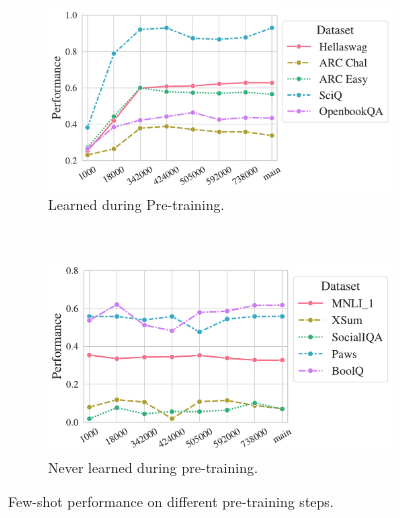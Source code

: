 
\begin{figure}[t!]
    \centering
    \begin{subfigure}[b]{0.47\textwidth}
    \includegraphics[width=\the\columnwidth]{figures/fig_files/base_improving.pdf}
        \caption{Learned during Pre-training.}
        \label{fig:base-eval-a}
    \end{subfigure}%
    ~ 
    \begin{subfigure}[b]{0.45\textwidth}
        \centering
    \includegraphics[width=\the\columnwidth]{figures/fig_files/base_notimproving.pdf}
        \caption{Never learned during pre-training.}
        \label{fig:base-eval-b}
    \end{subfigure}
    \caption{Few-shot performance on different pre-training steps.}
    \label{fig:base-eval}
\end{figure}
